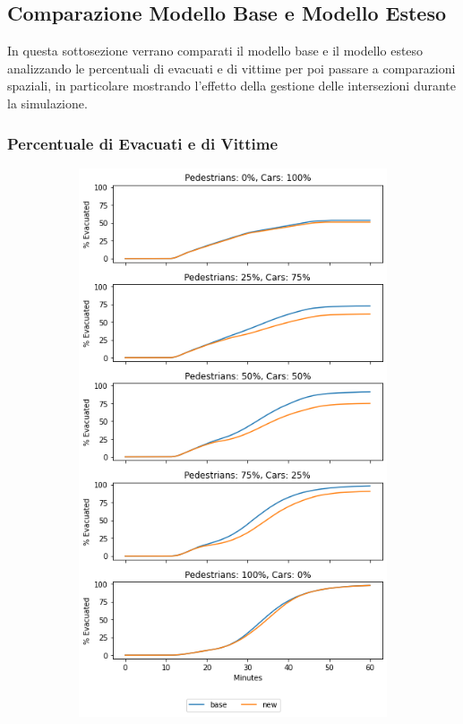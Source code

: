 \pagebreak

\subsection{Comparazione Modello Base e Modello Esteso}
In questa sottosezione verrano comparati il modello base e il modello esteso analizzando
le percentuali di evacuati e di vittime per poi passare a comparazioni spaziali,
in particolare mostrando l'effetto della gestione delle intersezioni durante la simulazione.

\subsubsection*{Percentuale di Evacuati e di Vittime}

\begin{figure}[ht]
    \centering
    \begin{subfigure}{0.45\textwidth}
        \centering
        \includegraphics[width=\textwidth]{images/analisi/comparison-total-evacuated.png}

\end{subfigure}
\end{figure}
